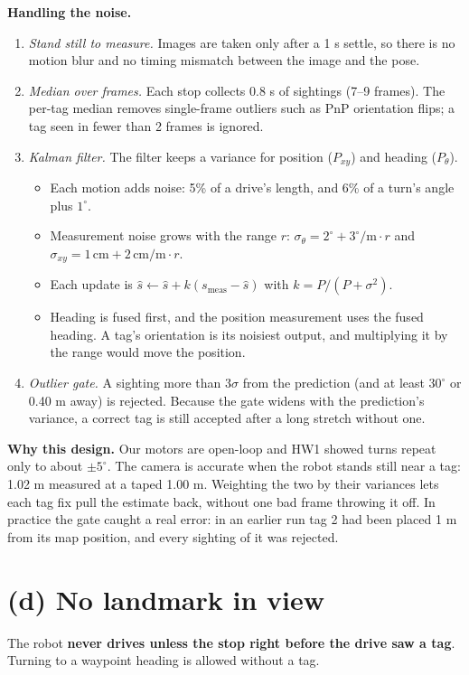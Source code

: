 \documentclass[10pt]{article}
\begin{document}
\textbf{Handling the noise.}
\begin{enumerate}
  \item \emph{Stand still to measure.} Images are taken only after a 1 s settle, so there is no motion blur and no timing mismatch between the image and the pose.
  \item \emph{Median over frames.} Each stop collects 0.8 s of sightings (7--9 frames). The per-tag median removes single-frame outliers such as PnP orientation flips; a tag seen in fewer than 2 frames is ignored.
  \item \emph{Kalman filter.} The filter keeps a variance for position ($P_{xy}$) and heading ($P_\theta$).
    \begin{itemize}
      \item Each motion adds noise: 5\% of a drive's length, and 6\% of a turn's angle plus $1^\circ$.
      \item Measurement noise grows with the range $r$: $\sigma_\theta = 2^\circ + 3^\circ/\text{m}\cdot r$ and $\sigma_{xy} = 1\,\text{cm} + 2\,\text{cm/m}\cdot r$.
      \item Each update is $\hat s \leftarrow \hat s + k(s_{\text{meas}} - \hat s)$ with $k = P/(P+\sigma^2)$.
      \item Heading is fused first, and the position measurement uses the fused heading. A tag's orientation is its noisiest output, and multiplying it by the range would move the position.
    \end{itemize}
  \item \emph{Outlier gate.} A sighting more than $3\sigma$ from the prediction (and at least $30^\circ$ or 0.40 m away) is rejected. Because the gate widens with the prediction's variance, a correct tag is still accepted after a long stretch without one.
\end{enumerate}
\textbf{Why this design.} Our motors are open-loop and HW1 showed turns repeat only to about $\pm5^\circ$. The camera is accurate when the robot stands still near a tag: 1.02 m measured at a taped 1.00 m. Weighting the two by their variances lets each tag fix pull the estimate back, without one bad frame throwing it off. In practice the gate caught a real error: in an earlier run tag 2 had been placed 1 m from its map position, and every sighting of it was rejected.

\section*{(d) No landmark in view}
The robot \textbf{never drives unless the stop right before the drive saw a tag}. Turning to a waypoint heading is allowed without a tag.
\end{document}
